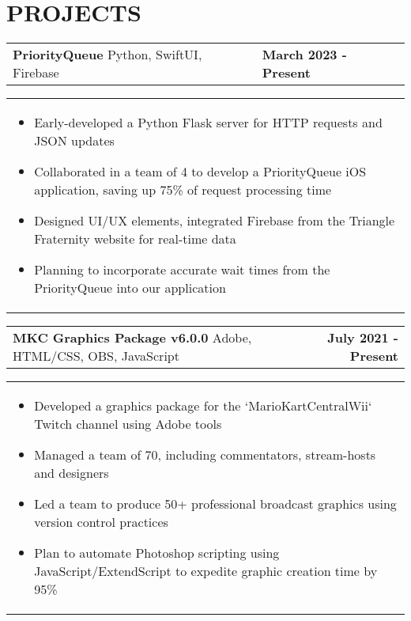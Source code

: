 \documentclass[10pt]{article}
\begin{document}
\vspace{-5pt}


\section*{PROJECTS}

\noindent \begin{tabularx}{\textwidth}{X >{\raggedleft\arraybackslash}X}
\textbf{PriorityQueue} \textbar{} Python, SwiftUI, Firebase & \textbf{March 2023 - Present} \\
\end{tabularx}

\vspace{-5pt}

\noindent \begin{tabularx}{\textwidth}{X}
\begin{itemize}[leftmargin=0.75cm, noitemsep, topsep=0pt, parsep=0pt, partopsep=0pt]
\item Early-developed a Python Flask server for HTTP requests and JSON updates
\item Collaborated in a team of 4 to develop a PriorityQueue iOS application, saving up 75\% of request processing time
\item Designed UI/UX elements, integrated Firebase from the Triangle Fraternity website for real-time data
\item Planning to incorporate accurate wait times from the PriorityQueue into our application
\end{itemize}
\end{tabularx}

\vspace{-5pt}



\noindent \begin{tabularx}{\textwidth}{X r}
\textbf{MKC Graphics Package v6.0.0} \textbar{} Adobe, HTML/CSS, OBS, JavaScript & \textbf{July 2021 - Present} \\
\end{tabularx}

\vspace{-5pt}

\noindent \begin{tabularx}{\textwidth}{X}
\begin{itemize}[leftmargin=0.75cm, noitemsep, topsep=0pt, parsep=0pt, partopsep=0pt]
\item Developed a graphics package for the `MarioKartCentralWii` Twitch channel using Adobe tools
\item Managed a team of 70, including commentators, stream-hosts and designers
\item Led a team to produce 50+ professional broadcast graphics using version control practices
\item Plan to automate Photoshop scripting using JavaScript/ExtendScript to expedite graphic creation time by 95\%
\end{itemize}
\end{tabularx}
\end{document}
